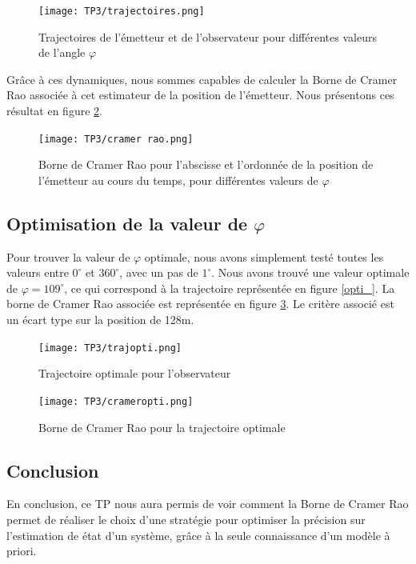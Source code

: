 \documentclass{article}
\begin{document}
 \begin{figure}[h!]
  \centering
  \texttt{[image: TP3/trajectoires.png]}
  \label{trajectoire}
  \caption{Trajectoires de l'émetteur et de l'observateur pour différentes valeurs de l'angle $\varphi$}
\end{figure}

Grâce à ces dynamiques, nous sommes capables de calculer la Borne de Cramer Rao associée à cet estimateur de la position de l'émetteur. 
Nous présentons ces résultat en figure \ref{cramerrao}. 

\begin{figure}[h!]
  \centering
  \texttt{[image: TP3/cramer rao.png]}
  \caption{Borne de Cramer Rao pour l'abscisse et l'ordonnée de la position de l'émetteur au cours du temps, pour différentes valeurs de $\varphi$}
  \label{cramerrao}
\end{figure}

\subsection{Optimisation de la valeur de $\varphi$}
Pour trouver la valeur de $\varphi$ optimale, nous avons simplement testé toutes les valeurs entre $0^{\circ}$ et $360^{\circ}$, avec un pas de 
$1^{\circ}$. Nous avons trouvé une valeur optimale de $\varphi = 109^{\circ}$, ce qui correspond à la trajectoire représentée en figure
\ref{opti_}. La borne de Cramer Rao associée est représentée en figure \ref{crameropti}. Le critère associé est un écart type sur la position de 128m.

\begin{figure}[h!]
   \centering
   \begin{minipage}[t]{8cm}
       \centering
       \texttt{[image: TP3/trajopti.png]}
       \caption{Trajectoire optimale pour l'observateur}
       \label{opti_}
   \end{minipage}
   \begin{minipage}[t]{8cm}
       \centering
       \texttt{[image: TP3/crameropti.png]}
       \caption{Borne de Cramer Rao pour la trajectoire optimale}
       \label{crameropti}
   \end{minipage}
\end{figure}

\subsection{Conclusion}
En conclusion, ce TP nous aura permis de voir comment la Borne de Cramer Rao permet de réaliser le choix d'une stratégie pour 
optimiser la précision sur l'estimation de état d'un système, grâce à la seule connaissance d'un modèle à priori.
\end{document}
